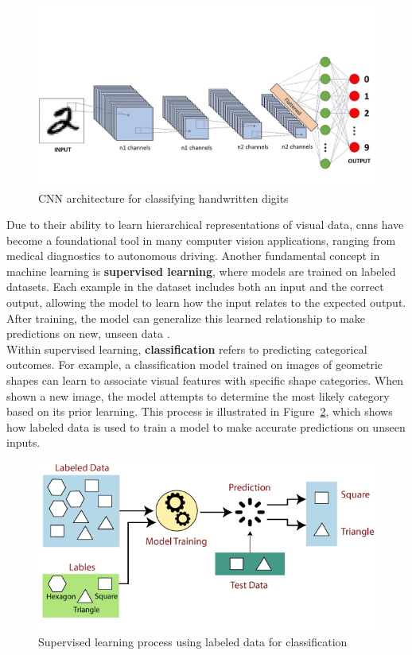 \newpage

\begin{figure}[h!] \centering \includegraphics[width=0.75\linewidth]{figures/theory/machine-learning/convolutional-neural-network.png} \caption[Example of CNN architecture for handwritten digit classification]{CNN architecture for classifying handwritten digits \cite{medium:cnn}} \label{fig:convolutional-neural-network} \end{figure}


Due to their ability to learn hierarchical representations of visual data, \glspl{cnn} have become a foundational tool in many computer vision applications, ranging from medical diagnostics to autonomous driving. Another fundamental concept in machine learning is \textbf{supervised learning}, where models are trained on labeled datasets. Each example in the dataset includes both an input and the correct output, allowing the model to learn how the input relates to the expected output. After training, the model can generalize this learned relationship to make predictions on new, unseen data \cite{geeksforgeeks:supervised-learning, google:supervised-learning}. \\

Within supervised learning, \textbf{classification} refers to predicting categorical outcomes. For example, a classification model trained on images of geometric shapes can learn to associate visual features with specific shape categories. When shown a new image, the model attempts to determine the most likely category based on its prior learning. This process is illustrated in Figure~\ref{fig:supervised-learning}, which shows how labeled data is used to train a model to make accurate predictions on unseen inputs. \\

\begin{figure}[h!] \centering \includegraphics[width=0.75\linewidth]{figures/theory/machine-learning/supervised-learning.png} \caption[Supervised Learning with labeled data]{Supervised learning process using labeled data for classification \cite{tpointtech:supervised-learning}} \label{fig:supervised-learning} \end{figure}

